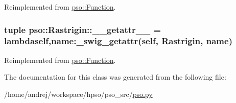 Reimplemented from \hyperlink{classpso_1_1Function_5bddc07dbaab0ee579488bdcc8103a71}{pso::Function}.\hypertarget{classpso_1_1Rastrigin_6301c8bda4feb384df57d0242ca4962e}{
\subsubsection{\setlength{\rightskip}{0pt plus 5cm}tuple {\bf pso::Rastrigin::\_\-\_\-getattr\_\-\_\-} = lambdaself,name:\_\-swig\_\-getattr(self, {\bf Rastrigin}, name)}}
\label{classpso_1_1Rastrigin_6301c8bda4feb384df57d0242ca4962e}




Reimplemented from \hyperlink{classpso_1_1Function_affeed856b337656e88895fa35321496}{pso::Function}.

The documentation for this class was generated from the following file:\begin{CompactItemize}
\item 
/home/andrej/workspace/hpso/pso\_\-src/\hyperlink{pso_8py}{pso.py}\end{CompactItemize}
